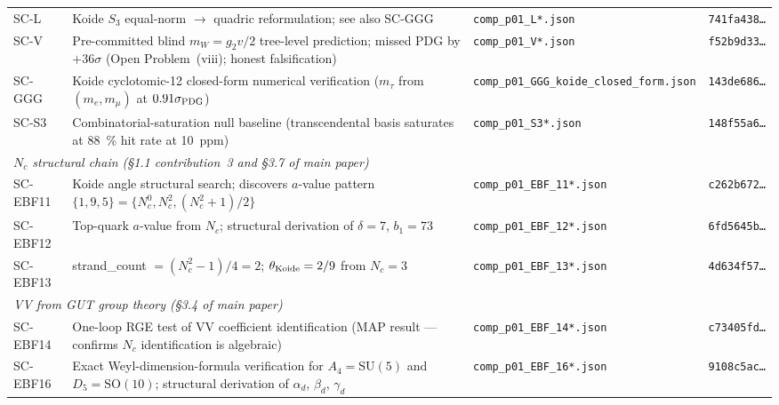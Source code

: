 \documentclass[10pt]{article}
\begin{document}
\begin{longtable}{@{} p{1.4cm} p{5.0cm} p{4.0cm} p{3.4cm} @{}}
SC-L & Koide $S_3$ equal-norm $\to$ quadric reformulation; see also SC-GGG & \nolinkurl{comp_p01_L*.json} & \texttt{741fa438\ldots} \\
SC-V & Pre-committed blind $m_W = g_2 v/2$ tree-level prediction; missed PDG by $+36\sigma$ (Open Problem~(viii); honest falsification) & \nolinkurl{comp_p01_V*.json} & \texttt{f52b9d33\ldots} \\
SC-GGG & Koide cyclotomic-12 closed-form numerical verification ($m_\tau$ from $(m_e, m_\mu)$ at $0.91\sigma_{\rm PDG}$) & \nolinkurl{comp_p01_GGG_koide_closed_form.json} & \texttt{143de686\ldots} \\
SC-S3 & Combinatorial-saturation null baseline (transcendental basis saturates at \SI{88}{\percent} hit rate at 10~ppm) & \nolinkurl{comp_p01_S3*.json} & \texttt{148f55a6\ldots} \\[6pt]

\multicolumn{4}{l}{\textit{$N_c$ structural chain (\S1.1 contribution~3 and \S3.7 of main paper)}} \\[2pt]
SC-EBF11 & Koide angle structural search; discovers $a$-value pattern $\{1,9,5\} = \{N_c^0, N_c^2, (N_c^2+1)/2\}$ & \nolinkurl{comp_p01_EBF_11*.json} & \texttt{c262b672\ldots} \\
SC-EBF12 & Top-quark $a$-value from $N_c$; structural derivation of $\delta = 7$, $b_1 = 73$ & \nolinkurl{comp_p01_EBF_12*.json} & \texttt{6fd5645b\ldots} \\
SC-EBF13 & strand\_count $= (N_c^2-1)/4 = 2$; $\theta_{\rm Koide} = 2/9$ from $N_c = 3$ & \nolinkurl{comp_p01_EBF_13*.json} & \texttt{4d634f57\ldots} \\[6pt]

\multicolumn{4}{l}{\textit{VV from GUT group theory (\S3.4 of main paper)}} \\[2pt]
SC-EBF14 & One-loop RGE test of VV coefficient identification (MAP result --- confirms $N_c$ identification is algebraic) & \nolinkurl{comp_p01_EBF_14*.json} & \texttt{c73405fd\ldots} \\
SC-EBF16 & Exact Weyl-dimension-formula verification for $A_4 = \mathrm{SU}(5)$ and $D_5 = \mathrm{SO}(10)$; structural derivation of $\alpha_d$, $\beta_d$, $\gamma_d$ & \nolinkurl{comp_p01_EBF_16*.json} & \texttt{9108c5ac\ldots} \\[6pt]


\end{longtable}
\end{document}
